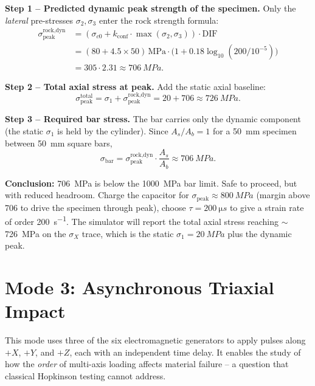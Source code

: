 \documentclass[11pt,a4paper]{article}
\providecommand{\SI}[2]{\qty{#1}{#2}}
\newcommand{\sig}{\sigma}
\newcommand{\Ab}{A_b}
\newcommand{\As}{A_s}
\newcommand{\sigpeak}{\sig_{\text{peak}}}
\begin{document}
\textbf{Step 1 -- Predicted dynamic peak strength of the specimen.} Only the
\emph{lateral} pre-stresses $\sig_2, \sig_3$ enter the rock strength formula:
\begin{align*}
  \sigpeak^{\text{rock,dyn}}
    &= (\sig_{c0} + k_{\text{conf}} \cdot \max(\sig_2, \sig_3)) \cdot \text{DIF} \\
    &= (80 + 4.5 \times 50) \,\text{MPa} \cdot
       \big(1 + 0.18 \log_{10}(200/10^{-5})\big) \\
    &= 305 \cdot 2.31 \approx \SI{706}{MPa}.
\end{align*}

\textbf{Step 2 -- Total axial stress at peak.} Add the static axial baseline:
\begin{equation*}
  \sigpeak^{\text{total}} = \sig_1 + \sigpeak^{\text{rock,dyn}}
                          = 20 + 706 \approx \SI{726}{MPa}.
\end{equation*}

\textbf{Step 3 -- Required bar stress.} The bar carries only the dynamic
component (the static $\sig_1$ is held by the cylinder). Since $\As/\Ab = 1$
for a \SI{50}{mm} specimen between \SI{50}{mm} square bars,
\begin{equation*}
  \sig_{\text{bar}} = \sigpeak^{\text{rock,dyn}} \cdot \frac{\As}{\Ab}
                    \approx \SI{706}{MPa}.
\end{equation*}

\textbf{Conclusion:} \SI{706}{MPa} is below the \SI{1000}{MPa} bar limit.
Safe to proceed, but with reduced headroom. Charge the capacitor for
$\sigpeak \approx \SI{800}{MPa}$
(margin above 706 to drive the specimen through peak), choose
$\tau = \SI{200}{\micro s}$ to give a strain rate of order \SI{200}{s^{-1}}.
The simulator will report the total axial stress reaching $\sim$\SI{726}{MPa}
on the $\sig_X$ trace, which is the static $\sig_1 = \SI{20}{MPa}$ plus the
dynamic peak.

\newpage
\section{Mode 3: Asynchronous Triaxial Impact}

This mode uses three of the six electromagnetic generators to apply pulses along
$+X$, $+Y$, and $+Z$, each with an independent time delay. It enables the study
of how the \emph{order} of multi-axis loading affects material failure -- a
question that classical Hopkinson testing cannot address.
\end{document}
